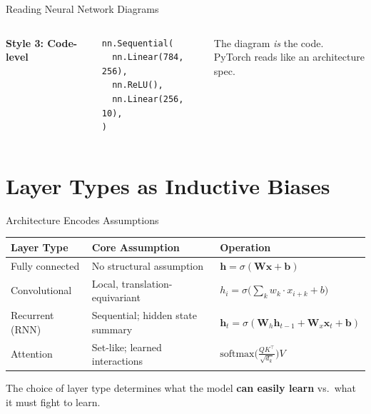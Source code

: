 \documentclass[aspectratio=169, 10pt]{beamer}
\newcommand{\keyword}[1]{\textcolor{ColumbiaBlue}{\textbf{#1}}}
\newcommand{\bad}[1]{\textcolor{AlertRed}{#1}}
\newcommand{\bx}{\bm{x}}
\newcommand{\bh}{\bm{h}}
\newcommand{\bW}{\bm{W}}
\newcommand{\bb}{\bm{b}}
\begin{document}
\begin{frame}[fragile]{Reading Neural Network Diagrams}
\begin{columns}[T]
\textbf{Style 3: Code-level}

\begin{lstlisting}[style=python, basicstyle=\ttfamily\fontsize{5.5}{7}\selectfont]
nn.Sequential(
  nn.Linear(784, 256),
  nn.ReLU(),
  nn.Linear(256, 10),
)
\end{lstlisting}

\vspace{4pt}
\scriptsize The diagram \emph{is} the code. \\
PyTorch reads like an architecture spec.

\end{columns}

\end{frame}

\section{Layer Types as Inductive Biases}

\begin{frame}{Architecture Encodes Assumptions}

\begin{table}
\centering\small
\begin{tabular}{@{}p{2.2cm}p{4.5cm}p{5.5cm}@{}}
\toprule
\textbf{Layer Type} & \textbf{Core Assumption} & \textbf{Operation} \\
\midrule
Fully connected & No structural assumption & $\bh = \sigma(\bW\bx + \bb)$ \\[4pt]
Convolutional & Local, translation-equivariant & $h_i = \sigma\!\bigl(\sum_k w_k \cdot x_{i+k} + b\bigr)$ \\[4pt]
Recurrent (RNN) & Sequential; hidden state summary & $\bh_t = \sigma(\bW_h \bh_{t-1} + \bW_x \bx_t + \bb)$ \\[4pt]
Attention & Set-like; learned interactions & $\text{softmax}\!\bigl(\frac{QK^\top}{\sqrt{d_k}}\bigr)V$ \\
\bottomrule
\end{tabular}
\end{table}

\vspace{6pt}
The choice of layer type determines what the model \keyword{can easily learn} vs.\ what it must \bad{fight to learn}.

\end{frame}
\end{document}

